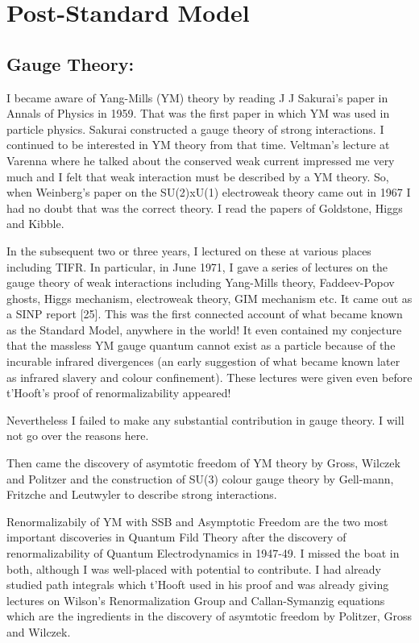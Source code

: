 \vspace{-\topsep}
\section*{Post-Standard Model}

\subsection*{Gauge Theory:}
\vskip -6pt
I became aware of Yang-Mills (YM) theory by reading J J Sakurai's paper 
in Annals of Physics in 1959. That was the first paper in which YM was 
used in particle physics. Sakurai constructed a gauge theory of strong 
interactions. I continued to be intere\-sted in YM theory from that time. 
Veltman's lecture at Varenna where he talked about the conserved weak 
current impressed me very much and I felt that weak interaction must be 
described by a YM theory. So, when Weinberg's paper on the SU(2)xU(1) 
electroweak theory came out in 1967 I had no doubt that was the correct 
theory. I read the papers of Goldstone, Higgs and Kibble.

In the subsequent two or three years, I lectured on these at various 
places including TIFR. In particular, in June 1971, I gave a series of 
lectures on the gauge theory of weak interactions including Yang-Mills 
theory, Faddeev-Popov ghosts, Higgs mecha\-nism, electroweak theory, GIM 
mechanism etc. It came out as a SINP report [25]. This was the first 
connected account of what became known as the Standard Model, anywhere 
in the world! It even contained my conjecture that the massless YM gauge 
quantum cannot exist as a particle because of the incurable infrared 
divergences (an early suggestion of what became known later as infrared 
slavery and colour confinement). These lectures were given even before 
t'Hooft's proof of renorma\-lizability appeared!

Nevertheless I failed to make any substantial contribution in gauge 
theory. I will not go over the reasons here.

Then came the discovery of asymtotic freedom of YM theory by Gross, 
Wilczek and Politzer and the construction of SU(3) colour gauge theory 
by Gell-mann, Fritzche and Leutwyler to describe strong interactions.

Renormalizabily of YM with SSB and Asymptotic Freedom are the two most 
important discoveries in Quantum Fild Theory after the discovery of 
renormalizability of Quantum Electrodynamics in 1947-49. I missed the 
boat in both, although I was well-placed with potential to contribute. I 
had already studied path integrals which t'Hooft used in his proof and 
was already giving lectures on Wilson's Renormalization Group and 
Callan-Symanzig equations which are the ingredients in the discovery of 
asymtotic freedom by Politzer, Gross and Wilczek.

